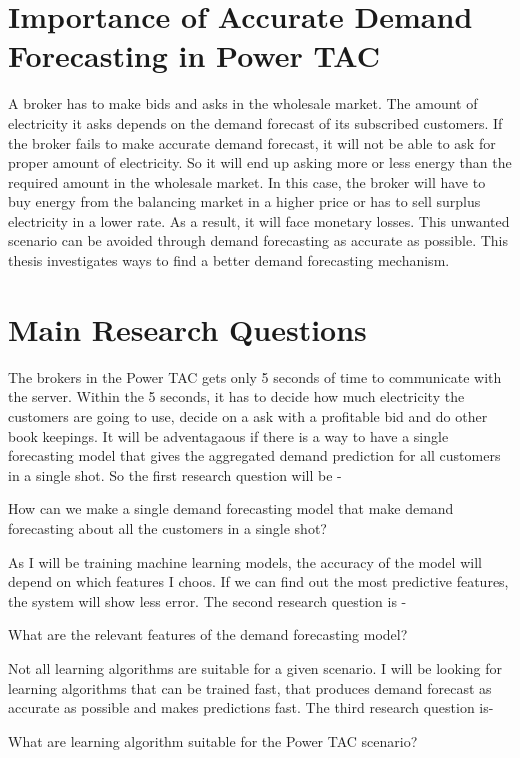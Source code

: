 \section{Importance of Accurate Demand Forecasting in Power TAC}
A broker has to make bids and asks in the wholesale market. The amount of electricity it asks depends on the demand forecast of its subscribed customers. If the broker fails to make accurate demand forecast, it will not be able to ask for proper amount of electricity. So it will end up asking more or less energy than the required amount in the wholesale market. In this case, the broker will have to buy energy from the balancing market in a higher price or has to sell surplus electricity in a lower rate. As a result, it will face monetary losses. This unwanted scenario can be avoided through demand forecasting as accurate as possible. This thesis investigates ways to find a better demand forecasting mechanism.

\section{Main Research Questions}
The brokers in the Power TAC gets only 5 seconds of time to communicate with the server. Within the 5 seconds, it has to decide how much electricity the customers are going to use, decide on a ask with a profitable bid and do other book keepings. It will be adventagaous if there is a way to have a single forecasting model that gives the aggregated demand prediction for all customers in a single shot. So the first research question will be - 
\begin{displayquote}
How can we make a single demand forecasting model that make demand forecasting about all the customers in a single shot?
\end{displayquote}

As I will be training machine learning models, the accuracy of the model will depend on which features I choos. If we can find out the most predictive features, the system will show less error. The second research question is -
\begin{displayquote}
What are the relevant features of the demand forecasting model?
\end{displayquote}

Not all learning algorithms are suitable for a given scenario. I will be looking for learning algorithms that can be trained fast, that produces demand forecast as accurate as possible and makes predictions fast. The third research question is-
\begin{displayquote}
What are learning algorithm suitable for the Power TAC scenario?
\end{displayquote}

